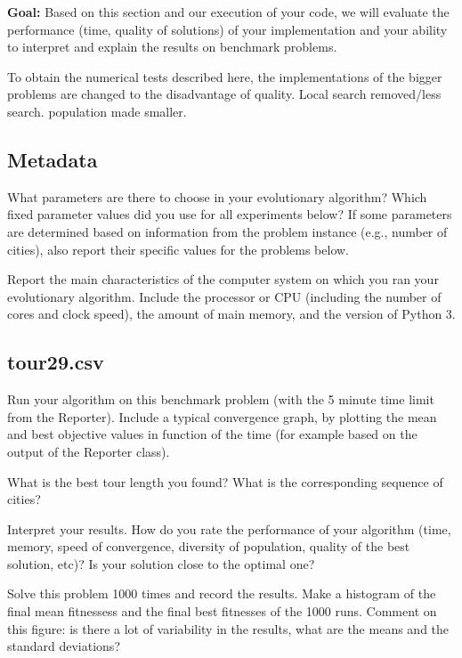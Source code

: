 \documentclass[a4paper,10pt]{article}
\newcommand{\ReplaceMe}[1]{{\color{blue}#1}}
\newcommand{\RemoveMe}[1]{{\color{purple}#1}}
\begin{document}
\RemoveMe{\textbf{Goal:} Based on this section and our execution of your code, we will evaluate the performance (time, quality of solutions) of your implementation and your ability to interpret and explain the results on benchmark problems.}

To obtain the numerical tests described here, the implementations of the bigger problems are changed to the disadvantage of quality. Local search removed/less search. population made smaller. 

\subsection{Metadata}

\ReplaceMe{What parameters are there to choose in your evolutionary algorithm? Which fixed parameter values did you use for all experiments below? If some parameters are determined based on information from the problem instance (e.g., number of cities), also report their specific values for the problems below.

Report the main characteristics of the computer system on which you ran your evolutionary algorithm. Include the processor or CPU (including the number of cores and clock speed), the amount of main memory, and the version of Python 3.}


\subsection{tour29.csv}

\ReplaceMe{Run your algorithm on this benchmark problem (with the 5 minute time limit from the Reporter). Include a typical convergence graph, by plotting the mean and best objective values in function of the time (for example based on the output of the Reporter class). 

What is the best tour length you found? What is the corresponding sequence of cities? 

Interpret your results. How do you rate the performance of your algorithm (time, memory, speed of convergence, diversity of population, quality of the best solution, etc)? Is your solution close to the optimal one?

Solve this problem 1000 times and record the results. Make a histogram of the final mean fitnessess and the final best fitnesses of the 1000 runs. Comment on this figure: is there a lot of variability in the results, what are the means and the standard deviations?}
\end{document}
